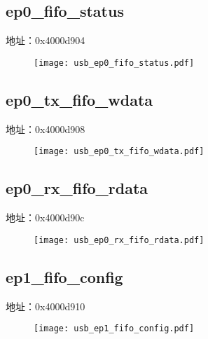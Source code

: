 \subsection{ep0\_fifo\_status}
\label{usb-ep0-fifo-status}
地址：0x4000d904
 \begin{figure}[H]
\texttt{[image: usb\_ep0\_fifo\_status.pdf]}
\end{figure}

\subsection{ep0\_tx\_fifo\_wdata}
\label{usb-ep0-tx-fifo-wdata}
地址：0x4000d908
 \begin{figure}[H]
\texttt{[image: usb\_ep0\_tx\_fifo\_wdata.pdf]}
\end{figure}

\subsection{ep0\_rx\_fifo\_rdata}
\label{usb-ep0-rx-fifo-rdata}
地址：0x4000d90c
 \begin{figure}[H]
\texttt{[image: usb\_ep0\_rx\_fifo\_rdata.pdf]}
\end{figure}

\subsection{ep1\_fifo\_config}
\label{usb-ep1-fifo-config}
地址：0x4000d910
 \begin{figure}[H]
\texttt{[image: usb\_ep1\_fifo\_config.pdf]}
\end{figure}

